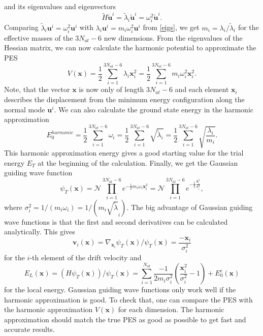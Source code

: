 \documentclass [12pt]{report}
\begin{document}
and its eigenvalues and eigenvectors
\begin{equation}
\tilde{H} \bm{\tilde{u}}^i = \tilde{\lambda}_i \bm{\tilde{u}}^i = \omega_i^2 \bm{\tilde{u}}^i.
\end{equation}
Comparing $\tilde{\lambda}_i \bm{u}^i = \omega_i^2 \bm{u}^i$ with $\lambda_i \bm{u}^i = m_i \omega_i^2 \bm{u}^i$ from \eqref{eigs}, we get $m_i = \lambda_i / \tilde{\lambda}_i$ for the effective masses of the $3 N_{at} - 6$ new dimensions.
From the eigenvalues of the Hessian matrix, we can now calculate the harmonic potential to approximate the PES
\begin{equation}
V(\bm{x}) = \frac{1}{2} \sum_{i=1}^{3N_{at}-6} \lambda_i \bm{x}_i^2 = \frac{1}{2} \sum_{i=1}^{3N_{at}-6} m_i \omega_i^2 \bm{x}_i^2.
\end{equation}
Note, that the vector $\bm{x}$ is now only of length $3 N_{at} - 6$ and  each element $\bm{x}_i$ describes the displacement from the minimum energy configuration along the normal mode $\bm{u}^i$.
We can also calculate the ground state energy in the harmonic approximation
\begin{equation}
E_0^{harmonic} = \frac{1}{2} \sum_{i=1}^{3N_{at}-6} \omega_i = \frac{1}{2}\sum_{i=1}^{3N_{at}-6}  \sqrt{\tilde{\lambda}_i} = \frac{1}{2} \sum_{i=1}^{3N_{at}-6}  \sqrt{\frac{\lambda_i}{m_i}}.
\end{equation}
This harmonic approximation energy gives a good starting value for the trial energy $E_T$ at the beginning of the calculation. Finally, we get the Gaussian guiding wave function
\begin{equation}
\psi_T(\bm{x}) = \mathcal{N} \prod_{i=1}^{3N_{at}-6}  e^{-\frac{1}{2} m_i \omega_i \bm{x}_i^2} = \mathcal{N} \prod_{i=1}^{3N_{at}-6} e^{-\frac{1}{2} \frac{\bm{x}_i^2}{\sigma_i^2}},
\end{equation}
where $\sigma_i^2 = 1/(m_i \omega_i) = 1/(m_i\sqrt{\tilde{\lambda}}_i)$. The big advantage of Gaussian guiding wave functions is that the first and second derivatives can be calculated analytically. This gives
\begin{equation}
\bm{v}_i(\bm{x}) = \nabla_{\bm{x}_i} \psi_T(\bm{x})/ \psi_T(\bm{x}) = \frac{-\bm{x}_i}{\sigma_i^2}
\end{equation}
for the $i$-th element of the drift velocity and 
\begin{equation}\label{el}
E_L(\bm{x}) = (H\psi_T(\bm{x}))/\psi_T(\bm{x}) = \sum_{i=1}^{N_{at}} \frac{-1}{2m_i \sigma^2_i} \left( \frac{\bm{x}_i^2}{\sigma^2_i} - 1 \right) + E_0^e(\bm{x})
\end{equation}
for the local energy.
Gaussian guiding wave functions only work well if the harmonic approximation is good. To check that, one can compare the PES with the harmonic approximation $V(\bm{x})$ for each dimension. The harmonic approximation should match the true PES as good as possible to get fast and accurate results.
\end{document}
